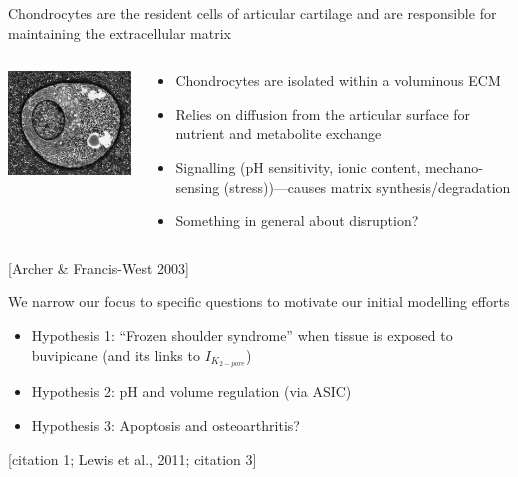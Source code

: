 \documentclass[ignorenonframetext]{beamer}
\newcommand{\references}[1] {
  \begin{flushright}
    \scriptsize [#1] \normalsize
  \end{flushright}
}
\begin{document}
\begin{frame}{Chondrocytes are the resident cells of articular
    cartilage and are responsible for maintaining the extracellular
    matrix}

 \begin{columns}

    \begin{column}{6cm}
      \includegraphics[width=6cm]{../images/pdf/chondrocyte}
    \end{column}

    \begin{column}{6cm}
      \begin{itemize}
      \item<1-> Chondrocytes are isolated within a voluminous
        ECM
      \item<1-> Relies on diffusion from the articular surface for
        nutrient and metabolite exchange\\[0.5cm]
        \pause
      \item<2-> Signalling (pH sensitivity, ionic content, mechano-sensing
        (stress))---causes matrix synthesis/degradation
      \item Something in general about disruption?
      \end{itemize}
    \end{column}

  \end{columns}

  \references{Archer \& Francis-West 2003}

\end{frame}

%

\begin{frame}{We narrow our focus to specific questions to motivate
    our initial modelling efforts}

  \begin{itemize}
  \item Hypothesis 1: ``Frozen shoulder syndrome'' when tissue is
    exposed to buvipicane (and its links to $I_{K_{2-pore}}$)
  \item Hypothesis 2: pH and volume regulation (via ASIC)
  \item Hypothesis 3: Apoptosis and osteoarthritis?
  \end{itemize}

\references{citation 1; Lewis et al., 2011; citation 3}

\end{frame}
\end{document}
